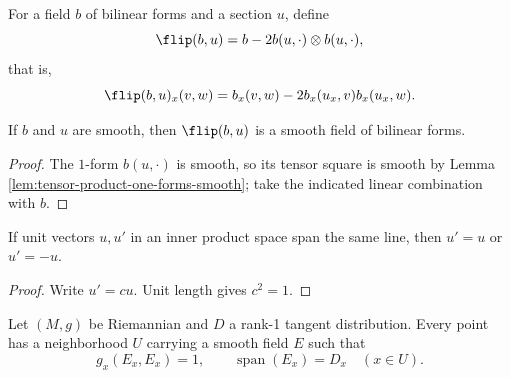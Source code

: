 \begin{definition}
\label{def:sign-flipped-form}





For a field $b$ of bilinear forms and a section $u$, define
\[
\flip(b,u)=b-2b(u,\cdot)\otimes b(u,\cdot),
\]
that is,
\[
\flip(b,u)_x(v,w)=b_x(v,w)-2b_x(u_x,v)b_x(u_x,w).
\]
\end{definition}

\begin{lemma}
\label{lem:sign-flipped-form-smooth}





If $b$ and $u$ are smooth, then $\flip(b,u)$ is a smooth field of bilinear forms.
\end{lemma}

\begin{proof}

\sketch The $1$-form $b(u,\cdot)$ is smooth, so its tensor square is smooth by
Lemma \ref{lem:tensor-product-one-forms-smooth}; take the indicated linear
combination with $b$.
\end{proof}

\begin{lemma}
\label{lem:two-unit-vectors-of-a-line}




If unit vectors $u,u'$ in an inner product space span the same line, then
$u'=u$ or $u'=-u$.
\end{lemma}

\begin{proof}

\sketch Write $u'=cu$. Unit length gives $c^2=1$.
\end{proof}

\begin{lemma}
\label{lem:local-unit-section}





Let $(M,g)$ be Riemannian and $D$ a rank-1 tangent distribution. Every point has
a neighborhood $U$ carrying a smooth field $E$ such that
\[
g_x(E_x,E_x)=1,
\qquad\operatorname{span}(E_x)=D_x
\quad(x\in U).
\]
\end{lemma}

